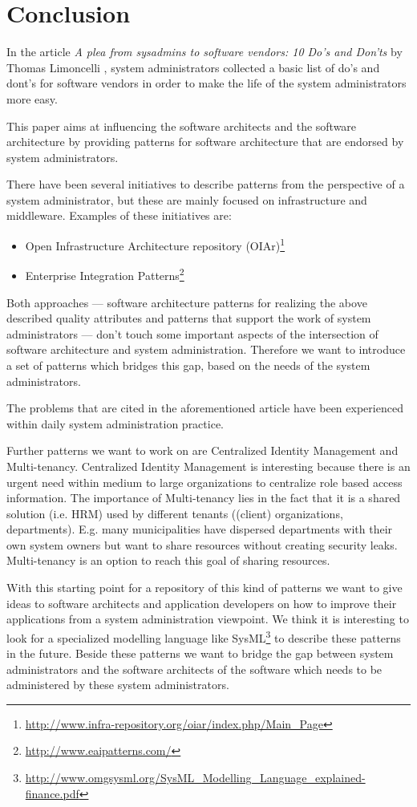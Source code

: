 \section{Conclusion} 

In the article \textit{A plea from sysadmins to software vendors: 10 Do's and Don'ts} by Thomas Limoncelli \cite{Limoncelli2011a}, system administrators collected a basic list of do's and dont's for software vendors in order to make the life of the system administrators more easy. 

This paper aims at influencing the software architects and the software architecture by providing patterns for software architecture that are endorsed by system administrators.

There have been several initiatives to describe patterns from the perspective of a system administrator, but these are mainly focused on infrastructure and middleware. Examples of these initiatives are: 
\begin{itemize}
	\item Open Infrastructure Architecture repository (OIAr)\footnote{\url{http://www.infra-repository.org/oiar/index.php/Main_Page}} 
	\item Enterprise Integration Patterns\footnote{\url{http://www.eaipatterns.com/}}
\end{itemize}

Both approaches --- software architecture patterns for realizing the above described quality attributes and patterns that support the work of system administrators --- don't touch some important aspects of the intersection of software architecture and system administration. Therefore we want to introduce a set of patterns which bridges this gap, based on the needs of the system administrators. 

The problems that are cited in the aforementioned article have been experienced within daily system administration practice. 

Further patterns we want to work on are {\sc Centralized Identity Management} and {\sc Multi-tenancy}. {\sc Centralized Identity Management} is interesting because there is an urgent need within medium to large organizations to centralize role based access information. The importance of {\sc Multi-tenancy} lies in the fact that it is a shared solution (i.e. HRM) used by different tenants ((client) organizations, departments). E.g. many municipalities have dispersed departments with their own system owners but want to share resources without creating security leaks. Multi-tenancy is an option to reach this goal of sharing resources.

With this starting point for a repository of this kind of patterns we want to give ideas to software architects and application developers on how to improve their applications from a system administration viewpoint. We think it is interesting to look for a specialized modelling language like SysML\footnote{\url{http://www.omgsysml.org/SysML_Modelling_Language_explained-finance.pdf}} to describe these patterns in the future. Beside these patterns we want to bridge the gap between system administrators and the software architects of the software which needs to be administered by these system administrators.
